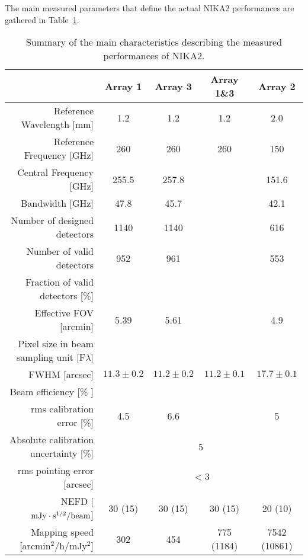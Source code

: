 The main measured parameters that define the actual NIKA2 performances are gathered in Table~\ref{nika2summary}.

\begin{table}[h]
  \caption{Summary of the main characteristics describing the measured performances of NIKA2.}
  \label{nika2summary}
  \begin{threeparttable}
    \begin{tabular}{|r|c|c|c|c|}
      \hline
      & Array 1 & Array 3  & Array 1\&3 & Array 2 \\
      \hline
      \hline
      Reference Wavelength  [mm]  &  1.2   &  1.2  & 1.2 & 2.0  \\
      Reference Frequency  [GHz]  &  260   &  260  & 260 & 150  \\
      Central Frequency [GHz]     &  255.5  &    257.8     &     &   151.6      \\
      Bandwidth         [GHz]     &   47.8  &     45.7     &     &    42.1      \\
      \hline
      Number of designed detectors       & 1140      &  1140    &    &    616      \\
      Number of valid detectors          &  952      &   961    &    &    553      \\
      Fraction of valid detectors [$\%$] &           &          &    &             \\
      Effective FOV\tnote{a}\hspace{1mm} [arcmin]    &   5.39    &   5.61    &    &   4.9      \\
      \hline
      Pixel size in beam sampling unit [F$\lambda$]  &    &   &    &   \\
      \hline
      FWHM\tnote{b}\hspace{1mm} [arcsec]  &  $11.3 \pm 0.2$   &  $11.2 \pm 0.2$  &   $11.2 \pm 0.1$  &  $17.7 \pm 0.1$   \\
      Beam efficiency\tnote{c}\hspace{1mm} [\% ]    &        &    &     &      \\
      \hline 
      rms calibration error [\%]            & 4.5  & 6.6  &   & 5 \\
      \hline
      Absolute calibration uncertainty [\%] &  \multicolumn{4}{|c|}{5} \\
      \hline
      rms pointing error    [arcsec]    & \multicolumn{4}{|c|}{$<3$} \\
      \hline
      NEFD\tnote{d}\hspace{1mm}   [$\rm{mJy} \cdot \rm{s}^{1/2}/\rm{beam}$]  &  30 (15)   & 30 (15)  &  30 (15)  & 20 (10) \\
      Mapping speed\tnote{e}\hspace{1mm} [arcmin$^2$/h/mJy$^2$] & 302  & 454  & 775 (1184)  & 7542 (10861) \\
\hline


\end{tabular}
\end{threeparttable}
\end{table}
